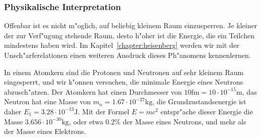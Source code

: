 \subsubsection{Physikalische Interpretation}
Offenbar ist es nicht m"oglich, auf beliebig kleinem Raum einzusperren.
Je kleiner der zur Verf"ugung stehende Raum, desto h"oher ist die
Energie, die ein Teilchen mindestens haben wird.
Im Kapitel~\ref{chapter:heisenberg} werden wir mit der Unsch"arferelationen
einen weiteren Ausdruck dieses Ph"anomens kennenlernen.

In einem Atomkern sind die Protonen und Neutronen auf sehr kleinem
Raum eingesperrt, und wir k"onnen versuchen, die minimale Energie 
eines Neutrons abzusch"atzen.
Der Atomkern hat einen Durchmesser von $10\text{fm}=10\cdot 10^{-15}\text{m}$,
das Neutron hat eine Masse von $m_n=1.67\cdot 10^{-27}\text{kg}$,
die Grundzustandsenergie ist daher $E_1=3.28\cdot10^{-13}\text{J}$.
Mit der Formel $E=mc^2$ entspr"ache dieser Energie die Masse
$3.656\cdot 10^{-30}\text{kg}$, oder etwa $0.2\%$ der Masse eines
Neutrons, und mehr als der Masse eines Elektrons.

